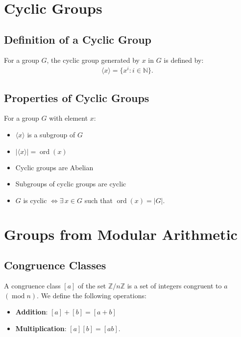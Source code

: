 \documentclass[a4paper, 12pt, twoside]{article}
\DeclareMathOperator{\Ord}{ord}
\DeclareMathOperator{\Mod}{mod}
\begin{document}
\newpage

\section{Cyclic Groups}

\subsection{Definition of a Cyclic Group}

For a group $G$, the cyclic group generated by $x$ in $G$ is defined by:
\begin{align*}
      \langle x \rangle = \{x^i : i \in \mathbb{N}\}.
\end{align*}

\subsection{Properties of Cyclic Groups}

For a group $G$ with element $x$:

\begin{itemize}
      \item $\langle x \rangle$ is a subgroup of $G$
      \item $|\langle x \rangle| = \Ord(x)$
      \item Cyclic groups are Abelian
      \item Subgroups of cyclic groups are cyclic
      \item $G$ is cyclic $\Leftrightarrow \exists \, x \in G$ such
            that $\Ord(x) = |G|$.
\end{itemize}

\section{Groups from Modular Arithmetic}

\subsection{Congruence Classes}

A congruence class $[a]$ of the set $\mathbb{Z}/n\mathbb{Z}$ is a set
of integers congruent to $a$ $(\Mod n)$. We define the following
operations:

\begin{itemize}
      \item \textbf{Addition}: $[a] + [b] = [a + b]$
      \item \textbf{Multiplication}: $[a][b] = [ab]$.
\end{itemize}
\end{document}

